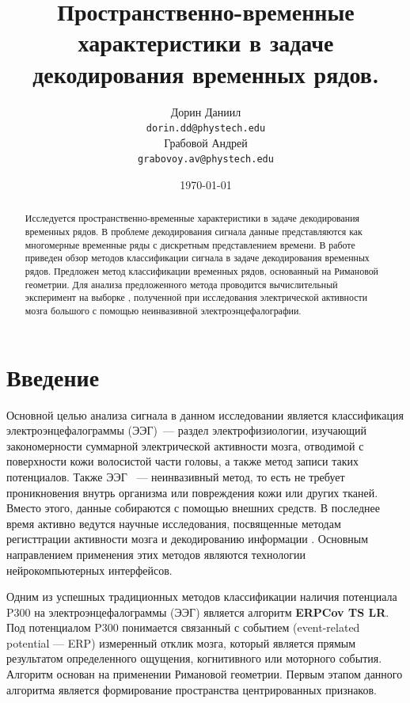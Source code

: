\documentclass[a4paper, 12pt]{extarticle}
\title{Пространственно-временные характеристики в задаче декодирования временных рядов.}
\author{
	Дорин Даниил \\
	\texttt{dorin.dd@phystech.edu} \\
	\And
	Грабовой Андрей \\
	\texttt{grabovoy.av@phystech.edu}
}
\date{\today}
\begin{document}
\maketitle

\begin{abstract}

	Исследуется пространственно-временные характеристики в задаче декодирования временных рядов. В проблеме декодирования 
	сигнала данные представляются как многомерные временные ряды с дискретным представлением времени. 
	В работе приведен обзор методов классификации сигнала в задаче декодирования временных рядов.
    Предложен метод классификации временных рядов, основанный на Римановой геометрии.
	Для анализа предложенного метода проводится вычислительный эксперимент на
	выборке \citep{misc_eeg_eye_state_264}, полученной при исследования электрической активности мозга большого с помощью неинвазивной электроэнцефалографии.

\end{abstract}


\section{Введение}
Основной целью анализа сигнала в данном исследовании является 
классификация электроэнцефалограммы (ЭЭГ)\citep{teplan2002fundamentals, beniczky2020electroencephalography}~--- раздел электрофизиологии, 
изучающий закономерности суммарной электрической активности мозга, 
отводимой с поверхности кожи волосистой части головы, 
а также метод записи таких потенциалов. Также ЭЭГ ~--- неинвазивный метод, то есть 
не требует проникновения внутрь организма или повреждения кожи или других тканей. 
Вместо этого, данные собираются с помощью внешних средств. 
В последнее время активно ведутся научные исследования, 
посвященные методам регисттрации активности мозга и декодированию 
информации \citep{siuly2016eeg, craik2019deep}. Основным направлением применения 
этих методов являются технологии нейрокомпьютерных интерфейсов.

Одним из успешных традиционных методов классификации наличия потенциала P300 на электроэнцефалограммы (ЭЭГ) является
алгоритм \textbf{ERPCov TS LR}. Под потенциалом P300 понимается связанный с 
событием (event-related potential — ERP) измеренный отклик мозга, 
который является прямым результатом определенного ощущения, 
когнитивного или моторного события.
Алгоритм основан на применении Римановой геометрии\citep{barachant2010riemannian}. 
Первым этапом данного алгоритма является формирование пространства центрированных признаков.
\end{document}
